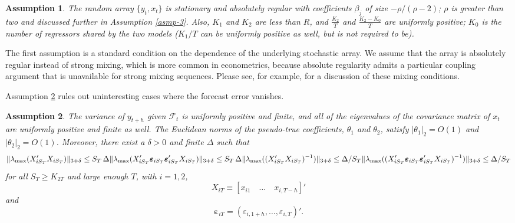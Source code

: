 \documentclass[11pt]{article}
\newtheorem{asmp}{Assumption}
\newcommand{\h}{h}
\newcommand{\ep}[1]{\ensuremath{\boldsymbol{\varepsilon}_{#1}}}
\begin{document}
\begin{asmp}\label{asmp-1} 
  The random array $\{y_t,x_t\}$ is stationary and
  absolutely regular with coefficients $\beta_j$ of size
  $-\rho/(\rho-2)$; $\rho$ is greater than two and discussed further
  in Assumption \ref{asmp-3}.  Also, $K_1$ and $K_2$ are less than $R$,
  and $\frac{K_2}{T}$ and $\frac{K_2-K_0}{T}$ are uniformly positive;
  $K_0$ is the number of regressors shared by the two models ($K_1/T$
  can be uniformly positive as well, but is not required to be).
\end{asmp}

The first assumption is a standard condition on the dependence of the
underlying stochastic array.  We assume that the array is absolutely
regular instead of strong mixing, which is more common in
econometrics, because absolute regularity admits a particular coupling
argument \citep{Ber:79} that is unavailable for strong mixing
sequences.  Please see, for example, \citet{Dav:94} for a discussion
of these mixing conditions.

Assumption \ref{asmp-2} rules out uninteresting cases where the
forecast error vanishes.
\begin{asmp}\label{asmp-2}
  The variance of $y_{t+\h}$ given $\mathcal{F}_t$ is uniformly
  positive and finite, and all of the eigenvalues of the covariance
  matrix of $x_t$ are uniformly positive and finite as well.  The
  Euclidean norms of the pseudo-true coefficients, $\theta_1$ and
  $\theta_2$, satisfy $|\theta_1|_2 = O(1)$ and $|\theta_2|_2 = O(1)$.
  Moreover, there exist a $\delta > 0$ and finite $\Delta$ such that
  \begin{equation*}
    \lVert \lambda_{\max}(X_{iS_{T}}'X_{iS_{T}}) \rVert_{3+\delta}
    \leq S_{T}\, \Delta \\
    \lVert
    \lambda_{\max}(X_{iS_{T}}'\ep{iS_{T}}\ep{iS_{T}}'X_{iS_{T}})
    \rVert_{3+\delta} \leq S_{T}\, \Delta \\
    \lVert \lambda_{\max}((X_{iS_{T}}'X_{iS_{T}})^{-1}) \rVert_{3+\delta} \leq \Delta/S_{T} \\
    \lVert
    \lambda_{\max}((X_{iS_{T}}'\ep{iS_{T}}\ep{iS_{T}}'X_{iS_{T}})^{-1})\rVert_{3+\delta}
    \leq \Delta/S_{T}
  \end{equation*}
  for all $S_{T} \geq K_{2T}$ and large enough $T$, with $i =
  1,2$,
  \[ X_{iT} \equiv [x_{i1} \quad \dots \quad x_{i,T-\h}]' \]
  and
  \[ \ep{iT} = (\varepsilon_{i,1+\h}, \dots, \varepsilon_{i,T})'.\]
\end{asmp}
\end{document}
